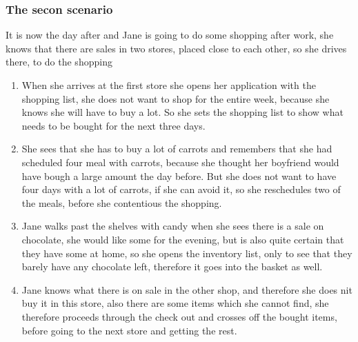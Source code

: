 \subsubsection{The secon scenario}
It is now the day after and Jane is going to do some shopping after work, she knows that there are sales in two stores, placed close to each other, so she drives there, to do the shopping
\begin{enumerate}
  \item When she arrives at the first store she opens her application with the shopping list, she does not want to shop for the entire week, because she knows she will have to buy a lot. So she sets the shopping list to show what needs to be bought for the next three days.
  \item She sees that she has to buy a lot of carrots and remembers that she had scheduled four meal with carrots, because she thought her boyfriend would have bough a large amount the day before. But she does not want to have four days with a lot of carrots, if she can avoid it, so she reschedules two of the meals, before she contentious the shopping.
  \item Jane walks past the shelves with candy when she sees there is a sale on chocolate, she would like some for the evening, but is also quite certain that they have some at home, so she opens the inventory list, only to see that they barely have any chocolate left, therefore it goes into the basket as well.
  \item Jane knows what there is on sale in the other shop, and therefore she does nit buy it in this store, also there are some items which she cannot find, she therefore proceeds through the check out and crosses off the bought items, before going to the next store and getting the rest.
\end{enumerate}

